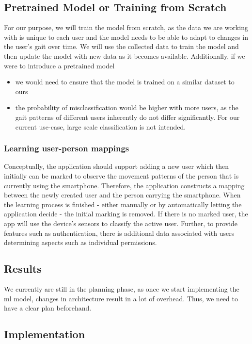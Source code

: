 \documentclass[a4paper,10pt]{article}
\begin{document}
\subsection{Pretrained Model or Training from Scratch}
For our purpose, we will train the model from scratch, as the data we are working with is unique to each user and the model needs to be able to adapt to changes in the user's gait over time. 
We will use the collected data to train the model and then update the model with new data as it becomes available.
Additionally, if we were to introduce a pretrained model \begin{itemize}
    \item we would need to ensure that the model is trained on a similar dataset to ours
    \item the probability of misclassification would be higher with more users, as the gait patterns of different users inherently do not differ significantly. For our current use-case, large scale classification is not intended.
\end{itemize}

\subsubsection{Learning user-person mappings}
Conceptually, the application should support adding a new user which then initially can be marked to observe the movement patterns of the person that is currently using the smartphone. Therefore, the application constructs a mapping between the newly created user and the person carrying the smartphone. When the learning process is finished - either manually or by automatically letting the application decide - the initial marking is removed. If there is no marked user, the app will use the device's sensors to classify the active user. Further, to provide features such as authentication, there is additional data associated with users determining aspects such as individual permissions.

\subsection{Results}
We currently are still in the planning phase, as once we start implementing the ml model, changes in architecture result in a lot of overhead. Thus, we need to have a clear plan beforehand.

\subsection{Implementation}
\end{document}
